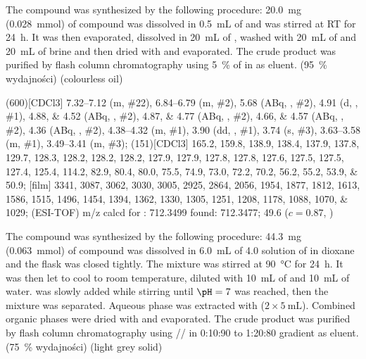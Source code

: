 The compound was synthesized by the following procedure:
\SI{20.0}{\milli\gram} (\SI{0.028}{\milli\mol}) of compound  was dissolved in \SI{0.5}{\milli\liter} of  and was stirred at RT for \SI{24}{\hour}.
It was then evaporated, dissolved in \SI{20}{\milli\liter} of ,
washed with \SI{20}{\milli\liter} of  and \SI{20}{\milli\liter} of brine and then dried with  and evaporated.
The crude product was purified by flash column chromatography using \SI{5}{\percent} of  in  as eluent.
(\SI{95}{\percent} wydajności) (colourless oil)

\begin{fullexp}
	\NMR(600)[CDCl3] \numrange{7.32}{7.12} (m, \#{22}), \numrange{6.84}{6.79} (m, \#{2}), \num{5.68} (ABq, , \#{2}), \num{4.91} (d, , \#{1}), \numlist{4.88;4.52} (ABq, , \#{2}), \numlist{4.87;4.77} (ABq, , \#{2}), \numlist{4.66;4.57} (ABq, , \#{2}), \num{4.36} (ABq, , \#{2}), \numrange{4.38}{4.32} (m, \#{1}), \num{3.90} (dd, , \#{1}), \num{3.74} (s, \#{3}), \numrange{3.63}{3.58} (m, \#{1}), \numrange{3.49}{3.41} (m, \#{3});
	(151)[CDCl3] \numlist{165.2; 159.8; 138.9; 138.4; 137.9; 137.8; 129.7; 128.3; 128.2; 128.2; 128.2; 127.9; 127.9; 127.8; 127.8; 127.6; 127.5; 127.5; 127.4; 125.4; 114.2; 82.9; 80.4; 80.0; 75.5; 74.9; 73.0; 72.2; 70.2; 56.2; 55.2; 53.9; 50.9};
	[film] \numlist{3341; 3087; 3062; 3030; 3005; 2925; 2864; 2056; 1954; 1877; 1812; 1613; 1586; 1515; 1496; 1454; 1394; 1362; 1330; 1305; 1251; 1208; 1178; 1088; 1070; 1029};
	 (ESI-TOF) m/z calcd for : \num{712.3499} found: \num{712.3477};
	\data{[$\alpha^{23}_D$]~$=$} \num{49.6} ($c = 0.87$, )
\end{fullexp}

The compound was synthesized by the following procedure:
\SI{44.3}{\milli\gram} (\SI{0.063}{\milli\mol}) of compound  was dissolved in \SI{6.0}{\milli\liter} of \SI{4.0}{\Molar} solution of  in dioxane and the flask was closed tightly.
The mixture was stirred at \SI{90}{\degreeCelsius} for \SI{24}{\hour}.
It was then let to cool to room temperature, diluted with \SI{10}{\milli\liter} of  and \SI{10}{\milli\liter} of water.
 was slowly added while stirring until $\pH = 7$ was reached, then the mixture was separated.
Aqueous phase was extracted with  ($2 \times \SI{5}{\milli\liter}$).
Combined organic phases were dried with  and evaporated.
The crude product was purified by flash column chromatography using // in 0:10:90 to 1:20:80 gradient as eluent.
(\SI{75}{\percent} wydajności) (light grey solid)

